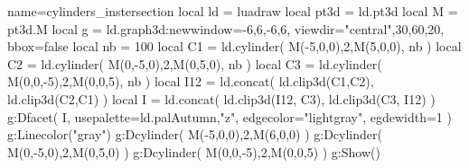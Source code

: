 \documentclass[border=5pt]{standalone}%
\begin{document}
\begin{luadraw}{name=cylinders_instersection}
local ld = luadraw
local pt3d = ld.pt3d
local M = pt3d.M
local g = ld.graph3d:new{window={-6,6,-6,6}, viewdir={"central",30,60,20}, bbox=false}
local nb = 100
local C1 = ld.cylinder( M(-5,0,0),2,M(5,0,0), nb )
local C2 = ld.cylinder( M(0,-5,0),2,M(0,5,0), nb )
local C3 = ld.cylinder( M(0,0,-5),2,M(0,0,5), nb )
local I12 = ld.concat( ld.clip3d(C1,C2), ld.clip3d(C2,C1) )
local I = ld.concat( ld.clip3d(I12, C3), ld.clip3d(C3, I12) )
g:Dfacet( I, {usepalette={ld.palAutumn,"z"}, edgecolor="lightgray", egdewidth=1} )
g:Linecolor("gray")
g:Dcylinder( M(-5,0,0),2,M(6,0,0) )
g:Dcylinder( M(0,-5,0),2,M(0,5,0) )
g:Dcylinder( M(0,0,-5),2,M(0,0,5) )
g:Show()
\end{luadraw}
\end{document}
